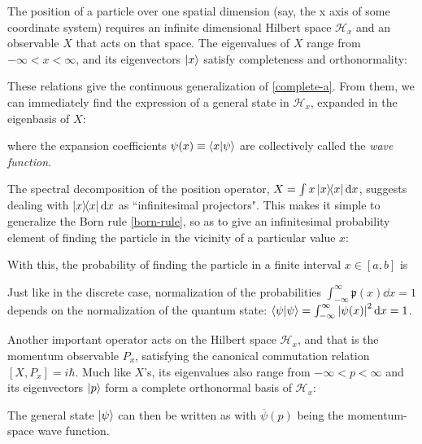 \documentclass[12pt,a4paper,notitlepage]{report}
\begin{document}
The position of a particle over one spatial dimension (say, the x axis of some coordinate system) requires an infinite dimensional Hilbert space $\mathcal{H}_x$ and an observable $X$ that acts on that space. The eigenvalues of $X$ range from $-\infty<x<\infty$, and its eigenvectors $\ket{x}$ satisfy completeness and orthonormality:

%
These relations give the continuous generalization of \eqref{complete-a}. From them, we can immediately find the expression of a general state in $\mathcal{H}_x$, expanded in the eigenbasis of $X$:

where the expansion coefficients $\psi(x) \equiv \bra{x}\ket{\psi}$ are collectively called the {\it wave function}.

The spectral decomposition of the position operator, $X = \int x \dyad{x} \dd{x}$, suggests dealing with $\dyad{x}\dd{x}$ as ``infinitesimal projectors". This makes it simple to generalize the Born rule \eqref{born-rule}, so as to give an infinitesimal probability element of finding the particle in the vicinity of a particular value $x$:

%
With this, the probability of finding the particle in a finite interval $x \in [a,b]$ is

%
Just like in the discrete case, normalization of the probabilities $\int_{-\infty}^{\infty}\mathfrak{p}(x)\dd{x} = 1$ depends on the normalization of the quantum state: $\bra{\psi}\ket{\psi}= \int_{-\infty}^{\infty}\left|\psi(x)\right|^2 \dd{x} = 1$.

Another important operator acts on the Hilbert space $\mathcal{H}_x$, and that is the momentum observable $P_x$, satisfying the canonical commutation relation $[X, P_x] = i\hbar$. Much like $X$'s, its eigenvalues also range from $-\infty < p < \infty$ and its eigenvectors $\ket{p}$ form a complete orthonormal basis of $\mathcal{H}_x$:

%
The general state $\ket{\psi}$ can then be written as
%
%
with $\overbar{\psi}(p)$ being the momentum-space wave function.
\end{document}
